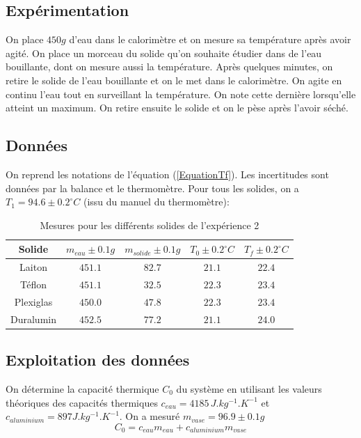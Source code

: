 \documentclass[12pt]{article}
\begin{document}
\subsection{Expérimentation}

On place $450g$ d'eau dans le calorimètre et on mesure sa température après avoir agité. On place un morceau du solide qu'on souhaite étudier dans de l'eau bouillante, dont on mesure aussi la température. 
Après quelques minutes, on retire le solide de l'eau bouillante et on le met dans le calorimètre. 
On agite en continu l'eau tout en surveillant la température. On note cette dernière lorsqu'elle atteint un maximum. 
On retire ensuite le solide et on le pèse après l'avoir séché.

\subsection{Données}
On reprend les notations de l'équation (\ref{EquationTf}). Les incertitudes sont données par la balance et le thermomètre. Pour tous les solides, on a $T_1=94.6\pm 0.2^{\circ}C$ (issu du manuel du thermomètre):
\begin{table}[h!]
	\begin{center}
		\begin{tabular}{|c|c|c|c|c|}
		\hline
		Solide & $m_{eau} \pm 0.1g$ & $m_{solide}\pm 0.1g$ & $T_0\pm 0.2^{\circ}C$ & $T_f\pm 0.2^{\circ}C$\\ \hline
		Laiton & $451.1$ & $82.7$ & $21.1$ & $22.4$ \\
		Téflon & $451.1$ & $32.5$ & $22.3$ & $23.4$ \\
		Plexiglas & $450.0$ & $47.8$ & $22.3$ & $23.4$ \\
		Duralumin & $452.5$ & $77.2$ & $21.1$ & $24.0$ \\ \hline
		\end{tabular}
		\caption{Mesures pour les différents solides de l'expérience 2}
		\label{table:mesureexp2}
	\end{center}
\end{table}

\subsection{Exploitation des données}
On détermine la capacité thermique $C_0$ du système en utilisant les valeurs théoriques des capacités thermiques $c_{eau}=4185\, J.kg^{-1}.K^{-1}$ et $c_{aluminium}=897 J.kg^{-1}.K^{-1}$. On a mesuré $m_{vase}=96.9\pm 0.1g$
\begin{equation}
C_0=c_{eau}m_{eau}+c_{aluminium}m_{vase}
\end{equation}
\end{document}

